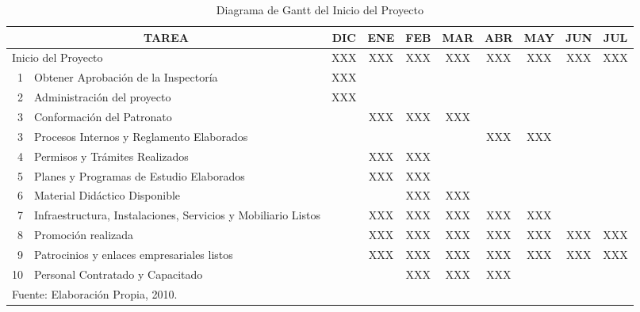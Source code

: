 \begin{table}
    \centering
    \caption{Diagrama de Gantt del Inicio del Proyecto}
    \label{tbl:Proy:Gantt}
    \footnotesize
    \begin{tabular}{r|p{6cm}|c|c|c|c|c|c|c|c}
        \multicolumn{2}{c|}{TAREA}                                         & DIC & ENE & FEB & MAR & ABR & MAY & JUN & JUL \\
        \hline
        \hline
        \multicolumn{2}{l|}{Inicio del Proyecto}                           & XXX & XXX & XXX & XXX & XXX & XXX & XXX & XXX \\
        \hline
        1  & Obtener Aprobación de la Inspectoría                          & XXX &     &     &     &     &     &     &     \\
        2  & Administración del proyecto                                   & XXX &     &     &     &     &     &     &     \\
        3  & Conformación del Patronato                                    &     & XXX & XXX & XXX &     &     &     &     \\
        3  & Procesos Internos y Reglamento Elaborados                     &     &     &     &     & XXX & XXX &     &     \\
        4  & Permisos y Trámites Realizados                                &     & XXX & XXX &     &     &     &     &     \\
        5  & Planes y Programas de Estudio Elaborados                      &     & XXX & XXX &     &     &     &     &     \\
        6  & Material Didáctico Disponible                                 &     &     & XXX & XXX &     &     &     &     \\
        7  & Infraestructura, Instalaciones, Servicios y Mobiliario Listos &     & XXX & XXX & XXX & XXX & XXX &     &     \\
        8  & Promoción realizada                                           &     & XXX & XXX & XXX & XXX & XXX & XXX & XXX \\
        9  & Patrocinios y enlaces empresariales listos                    &     & XXX & XXX & XXX & XXX & XXX & XXX & XXX \\
        10 & Personal Contratado y Capacitado                              &     &     & XXX & XXX & XXX &     &     &     \\
        \hline
        \multicolumn{10}{l}{\footnotesize Fuente: Elaboración Propia, 2010.}
    \end{tabular}
\end{table}

